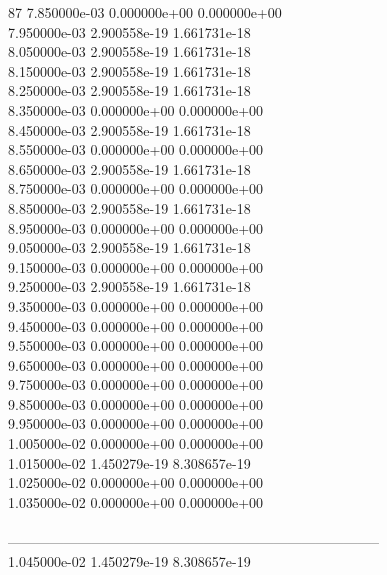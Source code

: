 87	7.850000e-03	0.000000e+00	0.000000e+00	\\ 	7.950000e-03	2.900558e-19	1.661731e-18	\\ 	8.050000e-03	2.900558e-19	1.661731e-18	\\ 	8.150000e-03	2.900558e-19	1.661731e-18	\\ 	8.250000e-03	2.900558e-19	1.661731e-18	\\ 	8.350000e-03	0.000000e+00	0.000000e+00	\\ 	8.450000e-03	2.900558e-19	1.661731e-18	\\ 	8.550000e-03	0.000000e+00	0.000000e+00	\\ 	8.650000e-03	2.900558e-19	1.661731e-18	\\ 	8.750000e-03	0.000000e+00	0.000000e+00	\\ 	8.850000e-03	2.900558e-19	1.661731e-18	\\ 	8.950000e-03	0.000000e+00	0.000000e+00	\\ 	9.050000e-03	2.900558e-19	1.661731e-18	\\ 	9.150000e-03	0.000000e+00	0.000000e+00	\\ 	9.250000e-03	2.900558e-19	1.661731e-18	\\ 	9.350000e-03	0.000000e+00	0.000000e+00	\\ 	9.450000e-03	0.000000e+00	0.000000e+00	\\ 	9.550000e-03	0.000000e+00	0.000000e+00	\\ 	9.650000e-03	0.000000e+00	0.000000e+00	\\ 	9.750000e-03	0.000000e+00	0.000000e+00	\\ 	9.850000e-03	0.000000e+00	0.000000e+00	\\ 	9.950000e-03	0.000000e+00	0.000000e+00	\\ 	1.005000e-02	0.000000e+00	0.000000e+00	\\ 	1.015000e-02	1.450279e-19	8.308657e-19	\\ 	1.025000e-02	0.000000e+00	0.000000e+00	\\ 	1.035000e-02	0.000000e+00	0.000000e+00	\\ \hline
\\ \hline
--------------------------------------------------------------------------------\\ 	1.045000e-02	1.450279e-19	8.308657e-19	\\ \hline
